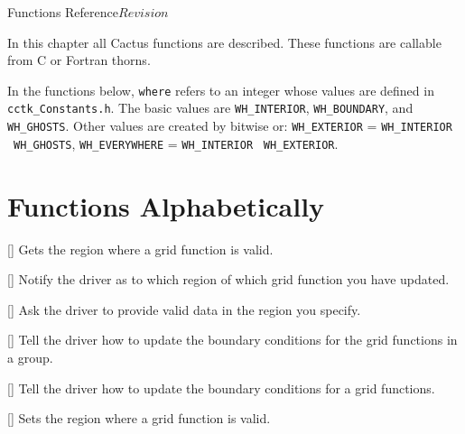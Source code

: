 \begin{cactuspart}{ Functions Reference}{}{$Revision$}
\label{part:DriverReference}
\renewcommand{\thepage}{\Alph{part}\arabic{page}}

In this chapter all  Cactus functions are described.
These functions are callable from C or Fortran thorns.

In the functions below, \texttt{where} refers to an integer whose values are defined in \texttt{cctk\_Constants.h}. The basic values are \texttt{WH\_INTERIOR}, \texttt{WH\_BOUNDARY}, and \texttt{WH\_GHOSTS}. Other values are created by bitwise or: \texttt{WH\_EXTERIOR} = \texttt{WH\_INTERIOR} \textbar~\texttt{WH\_GHOSTS}, \texttt{WH\_EVERYWHERE} = \texttt{WH\_INTERIOR} \textbar~\texttt{WH\_EXTERIOR}.


\chapter{Functions Alphabetically}

\begin{Lentry}

\item[\code{Driver\_GetValidRegion}] [\pageref{Driver-GetValidRegion}]
Gets the region where a grid function is valid.

\item[\code{Driver\_NotifyDataModified}] [\pageref{Driver-NotifyDataModified}]
Notify the driver as to which region of which grid function you have updated.

\item[\code{Driver\_RequireValidData}] [\pageref{Driver-RequireValidData}]
Ask the driver to provide valid data in the region you specify.

\item[\code{Driver\_SelectGroupForBC}] [\pageref{Driver-SelectGroupForBC}]
Tell the driver how to update the boundary conditions for the grid functions in a group.

\item[\code{Driver\_SelectVarForBC}] [\pageref{Driver-SelectVarForBC}]
Tell the driver how to update the boundary conditions for a grid functions.

\item[\code{Driver\_SetValidRegion}] [\pageref{Driver-SetValidRegion}]
Sets the region where a grid function is valid.


\end{Lentry}
\end{cactuspart}

